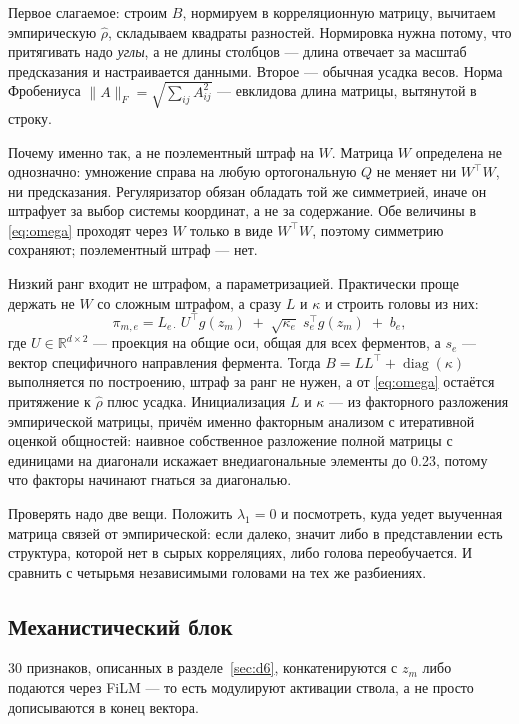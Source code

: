 Первое слагаемое: строим $B$, нормируем в корреляционную матрицу, вычитаем эмпирическую $\widehat{\rho}$,
складываем квадраты разностей. Нормировка нужна потому, что притягивать надо \emph{углы}, а не длины
столбцов --- длина отвечает за масштаб предсказания и настраивается данными. Второе --- обычная усадка весов.
Норма Фробениуса $\|A\|_F = \sqrt{\sum_{ij}A_{ij}^2}$ --- евклидова длина матрицы, вытянутой в строку.

Почему именно так, а не поэлементный штраф на $W$. Матрица $W$ определена не однозначно: умножение справа
на любую ортогональную $Q$ не меняет ни $W^{\top}W$, ни предсказания. Регуляризатор обязан обладать той же
симметрией, иначе он штрафует за выбор системы координат, а не за содержание. Обе величины в
\eqref{eq:omega} проходят через $W$ только в виде $W^{\top}W$, поэтому симметрию сохраняют; поэлементный
штраф --- нет.

Низкий ранг входит не штрафом, а параметризацией. Практически проще держать не $W$ со сложным штрафом,
а сразу $L$ и $\kappa$ и строить головы из них:
\begin{equation}
\pi_{m,e} = L_{e\cdot}\, U^{\top} g(z_m) \;+\; \sqrt{\kappa_e}\; s_e^{\top} g(z_m) \;+\; b_e ,
\label{eq:headfac}
\end{equation}
где $U \in \mathbb{R}^{d\times 2}$ --- проекция на общие оси, общая для всех ферментов, а $s_e$ --- вектор
специфичного направления фермента. Тогда $B = LL^{\top} + \operatorname{diag}(\kappa)$ выполняется
по построению, штраф за ранг не нужен, а от \eqref{eq:omega} остаётся притяжение к $\widehat{\rho}$
плюс усадка. Инициализация $L$ и $\kappa$ --- из факторного разложения эмпирической матрицы, причём
именно факторным анализом с итеративной оценкой общностей: наивное собственное разложение полной матрицы
с единицами на диагонали искажает внедиагональные элементы до 0.23, потому что факторы начинают гнаться
за диагональю.

Проверять надо две вещи. Положить $\lambda_1 = 0$ и посмотреть, куда уедет выученная матрица связей
от эмпирической: если далеко, значит либо в представлении есть структура, которой нет в сырых корреляциях,
либо голова переобучается. И сравнить с четырьмя независимыми головами на тех же разбиениях.

\subsection{Механистический блок}

30 признаков, описанных в разделе~\ref{sec:d6}, конкатенируются с $z_m$ либо подаются через FiLM ---
то есть модулируют активации ствола, а не просто дописываются в конец вектора.

